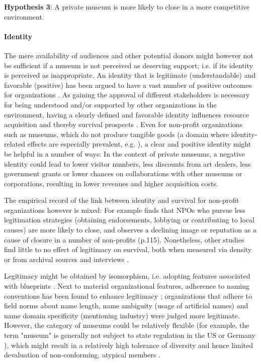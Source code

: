 \documentclass[12pt]{article}
\begin{document}
\textbf{Hypothesis 3}: A private museum is more likely to close in a more competitive environment.
\paragraph*{Identity}

The mere availability of audiences and other potential donors might however not be sufficient if a museum is not perceived as deserving support; i.e. if its identity is perceived as inappropriate. 
An identity that is legitimate (understandable) and favorable (positive) has been argued to have a vast number of positive outcomes for organizations \parencite{Lange_Lee_Dai_2010_reputation}.
As gaining the approval of different stakeholders is necessary for being understood and/or supported by other organizations in the environment, having a clearly defined and favorable identity influences resource acquisition and thereby survival prospects \parencite{Rao_1994_reputation}.
Even for non-profit organizations such as museums, which do not produce tangible goods (a domain where identity-related effects are especially prevalent, e.g. \cite{Hsu_2015_granted,Bogaert_etal_2014_ecological}), a clear and positive identity might be helpful in a number of ways:
In the context of private museums, a negative identity could lead to lower visitor numbers, less discounts from art dealers, less government grants or lower chances on collaborations with other museums or corporations, resulting in lower revenues and higher acquisition costs.


The empirical record of the link between identity and survival for non-profit organizations however is mixed: 
For example \textcite{Bielefeld_1994_survival} finds that NPOs who pursue less legitimation strategies (obtaining endorsements, lobbying or contributing to local causes) are more likely to close, and \textcite{HernandezOrtiz_2022_discontinuity} observes a declining image or reputation as a cause of closure in a number of non-profits (p.115).
Nonetheless, other studies find little to no effect of legitimacy on survival, both when measured via density \parencite{Bogaert_etal_2014_ecological} or from archival sources and interviews \parencite{Fernandez_2007_dissolution}.


Legitimacy might be obtained by isomorphism, i.e. adopting features associated with blueprints \parencite{diMaggio_1983_iron}.
Next to material organizational features, adherence to naming conventions has been found to enhance legitimacy \parencite{Glynn_Abzug_2002_names}; organizations that adhere to field norms about name length, name ambiguity (usage of artificial names) and name domain specificity (mentioning industry) were judged more legitimate. 
However, the category of museums could be relatively flexible (for example, the term "museum" is generally not subject to state regulation in the US or Germany \parencite{Museumsbund_ICOMDE_2006_standards,Lister_2023_marketing}), which might result in a relatively high tolerance of diversity and hence limited devaluation of non-conforming, atypical members \parencite{Bogaert_etal_2014_ecological}.
\end{document}

